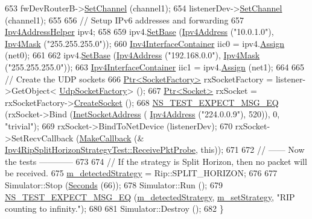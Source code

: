 \begin{DoxyCode}
653   fwDevRouterB->\hyperlink{classns3_1_1SimpleNetDevice_af9e9828ad584b5ba538f18f645f162e0}{SetChannel} (channel1);
654   listenerDev->\hyperlink{classns3_1_1SimpleNetDevice_af9e9828ad584b5ba538f18f645f162e0}{SetChannel} (channel1);
655 
656   \textcolor{comment}{// Setup IPv6 addresses and forwarding}
657   \hyperlink{classns3_1_1Ipv4AddressHelper}{Ipv4AddressHelper} ipv4;
658 
659   ipv4.\hyperlink{classns3_1_1Ipv4AddressHelper_acf7b16dd25bac67e00f5e25f90a9a035}{SetBase} (\hyperlink{classns3_1_1Ipv4Address}{Ipv4Address} (\textcolor{stringliteral}{"10.0.1.0"}), \hyperlink{classns3_1_1Ipv4Mask}{Ipv4Mask} (\textcolor{stringliteral}{"255.255.255.0"}));
660   \hyperlink{classns3_1_1Ipv4InterfaceContainer}{Ipv4InterfaceContainer} iic0 = ipv4.\hyperlink{classns3_1_1Ipv4AddressHelper_af8e7f4a1a7e74c00014a1eac445a27af}{Assign} (net0);
661 
662   ipv4.\hyperlink{classns3_1_1Ipv4AddressHelper_acf7b16dd25bac67e00f5e25f90a9a035}{SetBase} (\hyperlink{classns3_1_1Ipv4Address}{Ipv4Address} (\textcolor{stringliteral}{"192.168.0.0"}), \hyperlink{classns3_1_1Ipv4Mask}{Ipv4Mask} (\textcolor{stringliteral}{"255.255.255.0"}));
663   \hyperlink{classns3_1_1Ipv4InterfaceContainer}{Ipv4InterfaceContainer} iic1 = ipv4.\hyperlink{classns3_1_1Ipv4AddressHelper_af8e7f4a1a7e74c00014a1eac445a27af}{Assign} (net1);
664 
665   \textcolor{comment}{// Create the UDP sockets}
666   \hyperlink{classns3_1_1Ptr}{Ptr<SocketFactory>} rxSocketFactory = listener->GetObject<
      \hyperlink{classns3_1_1UdpSocketFactory}{UdpSocketFactory}> ();
667   \hyperlink{classns3_1_1Ptr}{Ptr<Socket>} rxSocket = rxSocketFactory->\hyperlink{classns3_1_1SocketFactory_a97351e6e7860503a4912042530449f62}{CreateSocket} ();
668   \hyperlink{group__testing_ga7304ba46a28d8cf08dfdfd6499cf7068}{NS\_TEST\_EXPECT\_MSG\_EQ} (rxSocket->Bind (\hyperlink{classns3_1_1InetSocketAddress}{InetSocketAddress} (
      \hyperlink{classns3_1_1Ipv4Address}{Ipv4Address} (\textcolor{stringliteral}{"224.0.0.9"}), 520)), 0, \textcolor{stringliteral}{"trivial"});
669   rxSocket->BindToNetDevice (listenerDev);
670   rxSocket->SetRecvCallback (\hyperlink{group__makecallbackmemptr_ga9376283685aa99d204048d6a4b7610a4}{MakeCallback} (&
      \hyperlink{classIpv4RipSplitHorizonStrategyTest_a45b34f91d22c8caae4960907300cba65}{Ipv4RipSplitHorizonStrategyTest::ReceivePktProbe}, \textcolor{keyword}{this}));
671 
672   \textcolor{comment}{// ------ Now the tests ------------}
673 
674   \textcolor{comment}{// If the strategy is Split Horizon, then no packet will be received.}
675   \hyperlink{classIpv4RipSplitHorizonStrategyTest_a5d6aa772524fbfc3865b823a5076a502}{m\_detectedStrategy} = Rip::SPLIT\_HORIZON;
676 
677   Simulator::Stop (\hyperlink{group__timecivil_ga33c34b816f8ff6628e33d5c8e9713b9e}{Seconds} (66));
678   Simulator::Run ();
679   \hyperlink{group__testing_ga7304ba46a28d8cf08dfdfd6499cf7068}{NS\_TEST\_EXPECT\_MSG\_EQ} (\hyperlink{classIpv4RipSplitHorizonStrategyTest_a5d6aa772524fbfc3865b823a5076a502}{m\_detectedStrategy}, 
      \hyperlink{classIpv4RipSplitHorizonStrategyTest_aca5223c1caeaa4074b4458ae3ec8e81c}{m\_setStrategy}, \textcolor{stringliteral}{"RIP counting to infinity."});
680 
681   Simulator::Destroy ();
682 \}
\end{DoxyCode}


